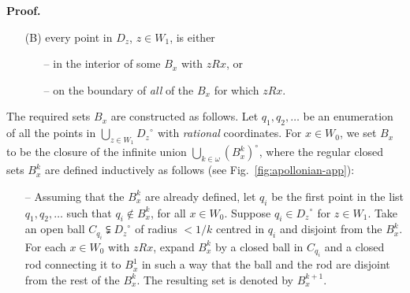 \documentclass{article}
\newcommand{\ti}[2][]{{#2}^{\circ_{#1}}}
\newcommand{\qedsymbol}{\ding{113}}
\newenvironment{proof}{\par\noindent\textbf{Proof.}}{\mbox{}\hfill\qedsymbol\par\bigskip}
\begin{document}
\begin{proof}
\begin{itemize}
\item[(B)] every point in $D_z$, $z\in W_1$, is either

\begin{itemize}
\item[--]
in the interior of some $B_x$ with $zRx$, or

\item[--] on the boundary of \emph{all} of the $B_x$ for which $zRx$.
\end{itemize}
\end{itemize}
The required sets $B_x$ are constructed as follows.
Let $q_1,
q_2, \ldots$ be an enumeration of all the points in $\bigcup_{z\in W_1} \ti{D_z}$ with \emph{rational} coordinates.
For $x\in W_0$, we set $B_x$ to be the closure of the infinite union $\bigcup_{k \in \omega} \ti{(B_x^k)}$, where the regular closed sets $B_x^k$ are defined inductively as follows (see Fig.~\ref{fig:apollonian-app}):
\begin{itemize}
\item[--] Assuming that the $B^k_x$ are already defined, let $q_i$ be the first point in the list $q_1,
q_2, \ldots$ such that $q_i\notin B^k_x$, for all $x\in W_0$. Suppose $q_i \in \ti{D_z}$ for $z\in W_1$. Take an open ball $C_{q_i} \subsetneqq \ti{D_z}$ of radius $< 1/k$ centred in $q_i$ and disjoint from the $B^k_x$. For each $x\in W_0$ with $zRx$, expand $B_x^k$ by a closed ball in $C_{q_i}$ and a closed rod connecting it to $B_x^1$ in such a way that the ball and the rod are disjoint from the rest of the $B^k_x$. The resulting set is denoted by $B^{k+1}_x$.
\end{itemize}
\begin{figure}[h]
\begin{center}
\end{center}
\end{figure}
\end{proof}
\end{document}
